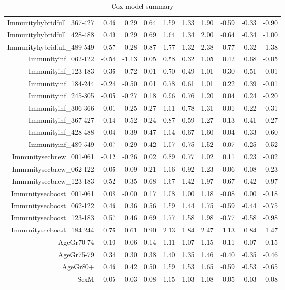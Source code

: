 \begin{table}[ht]
\begin{tabular}{rrrrrrrrrr}
  Immunityhybridfull\_367-427 & 0.46 & 0.29 & 0.64 & 1.59 & 1.33 & 1.90 & -0.59 & -0.33 & -0.90 \\ 
  Immunityhybridfull\_428-488 & 0.49 & 0.29 & 0.69 & 1.64 & 1.34 & 2.00 & -0.64 & -0.34 & -1.00 \\ 
  Immunityhybridfull\_489-549 & 0.57 & 0.28 & 0.87 & 1.77 & 1.32 & 2.38 & -0.77 & -0.32 & -1.38 \\ 
  Immunityinf\_062-122 & -0.54 & -1.13 & 0.05 & 0.58 & 0.32 & 1.05 & 0.42 & 0.68 & -0.05 \\ 
  Immunityinf\_123-183 & -0.36 & -0.72 & 0.01 & 0.70 & 0.49 & 1.01 & 0.30 & 0.51 & -0.01 \\ 
  Immunityinf\_184-244 & -0.24 & -0.50 & 0.01 & 0.78 & 0.61 & 1.01 & 0.22 & 0.39 & -0.01 \\ 
  Immunityinf\_245-305 & -0.05 & -0.27 & 0.18 & 0.96 & 0.76 & 1.20 & 0.04 & 0.24 & -0.20 \\ 
  Immunityinf\_306-366 & 0.01 & -0.25 & 0.27 & 1.01 & 0.78 & 1.31 & -0.01 & 0.22 & -0.31 \\ 
  Immunityinf\_367-427 & -0.14 & -0.52 & 0.24 & 0.87 & 0.59 & 1.27 & 0.13 & 0.41 & -0.27 \\ 
  Immunityinf\_428-488 & 0.04 & -0.39 & 0.47 & 1.04 & 0.67 & 1.60 & -0.04 & 0.33 & -0.60 \\ 
  Immunityinf\_489-549 & 0.07 & -0.29 & 0.42 & 1.07 & 0.75 & 1.52 & -0.07 & 0.25 & -0.52 \\ 
  Immunitysecbnew\_001-061 & -0.12 & -0.26 & 0.02 & 0.89 & 0.77 & 1.02 & 0.11 & 0.23 & -0.02 \\ 
  Immunitysecbnew\_062-122 & 0.06 & -0.09 & 0.21 & 1.06 & 0.92 & 1.23 & -0.06 & 0.08 & -0.23 \\ 
  Immunitysecbnew\_123-183 & 0.52 & 0.35 & 0.68 & 1.67 & 1.42 & 1.97 & -0.67 & -0.42 & -0.97 \\ 
  Immunitysecboost\_001-061 & 0.08 & -0.00 & 0.17 & 1.08 & 1.00 & 1.18 & -0.08 & 0.00 & -0.18 \\ 
  Immunitysecboost\_062-122 & 0.46 & 0.36 & 0.56 & 1.59 & 1.44 & 1.75 & -0.59 & -0.44 & -0.75 \\ 
  Immunitysecboost\_123-183 & 0.57 & 0.46 & 0.69 & 1.77 & 1.58 & 1.98 & -0.77 & -0.58 & -0.98 \\ 
  Immunitysecboost\_184-244 & 0.76 & 0.61 & 0.90 & 2.13 & 1.84 & 2.47 & -1.13 & -0.84 & -1.47 \\ 
  AgeGr70-74 & 0.10 & 0.06 & 0.14 & 1.11 & 1.07 & 1.15 & -0.11 & -0.07 & -0.15 \\ 
  AgeGr75-79 & 0.34 & 0.30 & 0.38 & 1.40 & 1.35 & 1.46 & -0.40 & -0.35 & -0.46 \\ 
  AgeGr80+ & 0.46 & 0.42 & 0.50 & 1.59 & 1.53 & 1.65 & -0.59 & -0.53 & -0.65 \\ 
  SexM & 0.05 & 0.03 & 0.08 & 1.05 & 1.03 & 1.08 & -0.05 & -0.03 & -0.08 \\ 
   \hline
\end{tabular}
\caption{Cox model summary} 
\end{table}
